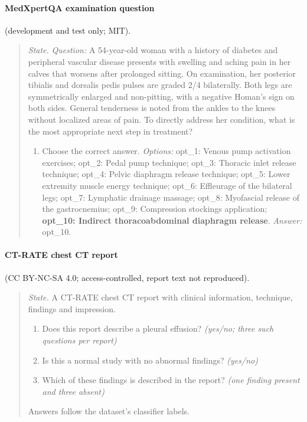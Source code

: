 \paragraph{MedXpertQA examination question} (development and test only; MIT).
\begin{quote}\footnotesize\raggedright
\textit{State.} \textit{Question:} A 54-year-old woman with a history of diabetes and peripheral vascular disease presents with swelling and aching pain in her calves that worsens after prolonged sitting. On examination, her posterior tibialis and dorsalis pedis pulses are graded 2/4 bilaterally. Both legs are symmetrically enlarged and non-pitting, with a negative Homan’s sign on both sides. General tenderness is noted from the ankles to the knees without localized areas of pain. To directly address her condition, what is the most appropriate next step in treatment?
\begin{enumerate}[label=Q\arabic*.,leftmargin=2.2em,itemsep=1pt,topsep=2pt]
  \item Choose the correct answer. \textit{Options:} opt\_\allowbreak{}1: Venous pump activation exercises; opt\_\allowbreak{}2: Pedal pump technique; opt\_\allowbreak{}3: Thoracic inlet release technique; opt\_\allowbreak{}4: Pelvic diaphragm release technique; opt\_\allowbreak{}5: Lower extremity muscle energy technique; opt\_\allowbreak{}6: Effleurage of the bilateral legs; opt\_\allowbreak{}7: Lymphatic drainage massage; opt\_\allowbreak{}8: Myofascial release of the gastrocnemius; opt\_\allowbreak{}9: Compression stockings application; \textbf{opt\_\allowbreak{}10: Indirect thoracoabdominal diaphragm release}. \textit{Answer:} opt\_10.
\end{enumerate}
\end{quote}

\paragraph{CT-RATE chest CT report} (CC BY-NC-SA 4.0; access-controlled, report text not reproduced).
\begin{quote}\footnotesize\raggedright
\textit{State.} A CT-RATE chest CT report with clinical information, technique, findings and impression.
\begin{enumerate}[label=Q\arabic*.,leftmargin=2.2em,itemsep=1pt,topsep=2pt]
  \item Does this report describe a pleural effusion? \textit{(yes/no; three such questions per report)}
  \item Is this a normal study with no abnormal findings? \textit{(yes/no)}
  \item Which of these findings is described in the report? \textit{(one finding present and three absent)}
\end{enumerate}
Answers follow the dataset's classifier labels.
\end{quote}

